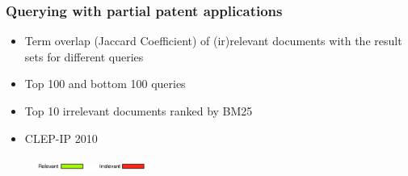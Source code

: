 \documentclass[xcolor=x11names,compress]{beamer}
\renewcommand{\(}{\begin{columns}}
\renewcommand{\)}{\end{columns}}
\newcommand{\<}[1]{\begin{column}{#1}}
\renewcommand{\>}{\end{column}}
\begin{document}
\begin{frame}
\frametitle{Querying with partial patent applications}

\begin{tiny}
\begin{itemize}
\item Term overlap (Jaccard Coefficient) of (ir)relevant documents with the result sets for different queries
\item Top 100 and bottom 100 queries
\item Top 10 irrelevant documents ranked by BM25 ~\cite{Robertson1993}
\item CLEP-IP 2010  
\end{itemize}
\end{tiny}

\begin{small}
\begin{figure}
\includegraphics[width=3.5cm]{../img/legend} 

\end{figure}
\end{small}
\end{frame}
\end{document}
